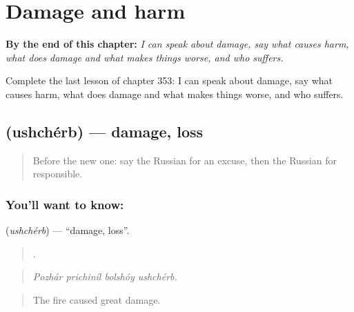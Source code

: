 
\chapter{Damage and harm}
\label{ch:ru-damage-and-harm}

\begin{chapteropening}
\textbf{By the end of this chapter:} \emph{I can speak about damage, say what causes harm, what does damage and what makes things worse, and who suffers.}

Complete the last lesson of chapter 353: I can speak about damage, say what causes harm, what does damage and what makes things worse, and who suffers.
\end{chapteropening}

\section[\texorpdfstring{\ru{ущерб} (ushchérb)}{ущерб (ushchérb)}]{ (ushchérb) — damage, loss}

\label{lesson:RU-C353-ushcherb}



\begin{quote}
Before the new one: say the Russian for an excuse, then the Russian for responsible.
\end{quote}

\subsection*{You'll want to know: }
\textbf{} (\emph{ushchérb}) — \textquotedblleft{}damage, loss\textquotedblright{}.

\begin{quote}
   .
\end{quote}

\begin{quote}
\emph{Pozhár prichiníl bolshóy ushchérb.}
\end{quote}

\begin{quote}
The fire caused great damage.
\end{quote}

